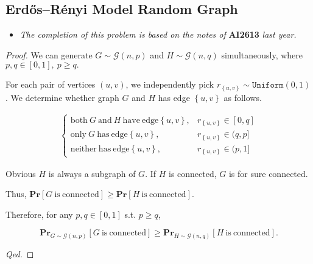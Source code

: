 \documentclass{article}
\begin{document}
\vspace{9em}
\subsection{Erdős–Rényi Model Random Graph}
\vspace{1em}

\begin{itemize}
    \item \textit{The completion of this problem is based on the notes of}\textbf{ AI2613 }\textit{last year.}
\end{itemize}

\vspace{2em}
\begin{proof}
We can generate $G\sim\mathcal{G}(n,p)$ and $H\sim\mathcal{G}(n,q)$ simultaneously, where $p,q\in[0,1],\ p\geq q.$

\hspace{1.3em}
For each pair of vertices $(u,v)$, we independently pick $r_{\left\{u,v\right\}}\sim\mathtt{Uniform}(0,1)$. We determine whether graph $G$ and $H$ has edge $\left\{u,v\right\}$ as follows.

\vspace{-2em}
\begin{align*}
    \left\{\begin{array}{ll}
        \mathrm{both\ }G\mathrm{\ and\ }H\mathrm{\ have\ edge}\left\{u,v\right\}, & r_{\left\{u,v\right\}}\in[0,q] \\
        \mathrm{only\ }G\mathrm{\ has\ edge}\left\{u,v\right\}, & r_{\left\{u,v\right\}}\in(q,p] \\
        \mathrm{neither\ has\ edge}\left\{u,v\right\}, & r_{\left\{u,v\right\}}\in(p,1]
    \end{array}\right.
\end{align*}

\vspace{-0.5em} \hspace{1.3em}
Obvious $H$ is always a subgraph of $G$. If $H$ is connected, $G$ is for sure connected.

\hspace{1.3em}
Thus, $\mathbf{Pr}\left[G\mathrm{\ is\ connected}\right]\geq\mathbf{Pr}\left[H\mathrm{\ is\ connected}\right]$.

\vspace{1em} \hspace{1.3em}
Therefore, for any $p,q\in[0,1]$ s.t. $p\geq q$, 

\vspace{-1em}
$$\mathbf{Pr}_{G\sim\mathcal{G}(n,p)}\left[G\mathrm{\ is\ connected}\right]\geq\mathbf{Pr}_{H\sim\mathcal{G}(n,q)}\left[H\mathrm{\ is\ connected}\right].$$

\hspace{38em}
\textit{Qed.}
\end{proof}
\end{document}
